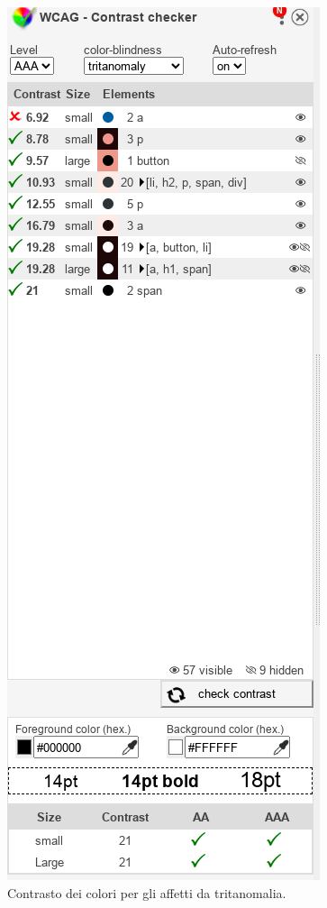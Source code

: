 \documentclass{template}
\begin{document}
	\begin{figure}[H]
		\centering
		\includegraphics[scale=0.6]{src/contrasti/tritanomaly.png}
		\caption{Contrasto dei colori per gli affetti da tritanomalia.}
	\end{figure}
	\pagebreak
\end{document}
